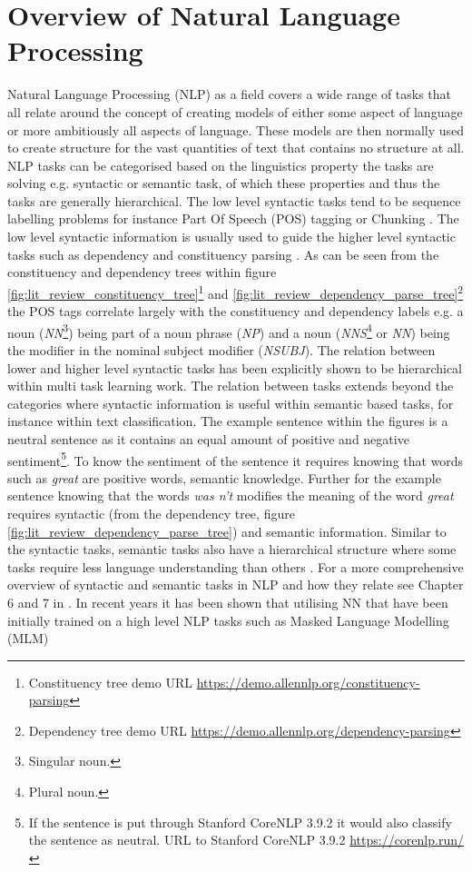 \section{Overview of Natural Language Processing}
Natural Language Processing (NLP) as a field covers a wide range of tasks that all relate around the concept of creating models of either some aspect of language or more ambitiously all aspects of language. These models are then normally used to create structure for the vast quantities of text that contains no structure at all. NLP tasks can be categorised based on the linguistics property the tasks are solving e.g. syntactic or semantic task, of which these properties and thus the tasks are generally hierarchical. The low level syntactic tasks tend to be sequence labelling problems for instance Part Of Speech (POS) tagging \citep{church-1988-stochastic, ling-etal-2015-finding} or Chunking \citep{tjong-kim-sang-buchholz-2000-introduction}. The low level syntactic information is usually used to guide the higher level syntactic tasks such as dependency \citep{nivre-etal-2007-conll} and constituency parsing \citep{collins-2003-head}. As can be seen from the constituency and dependency trees within figure \ref{fig:lit_review_constituency_tree}\footnote{Constituency tree demo URL \url{https://demo.allennlp.org/constituency-parsing}} and \ref{fig:lit_review_dependency_parse_tree}\footnote{Dependency tree demo URL \url{https://demo.allennlp.org/dependency-parsing}} the POS tags correlate largely with the constituency and dependency labels e.g. a noun (\textit{NN}\footnote{Singular noun.}) being part of a noun phrase (\textit{NP}) and a noun (\textit{NNS}\footnote{Plural noun.} or \textit{NN}) being the modifier in the nominal subject modifier (\textit{NSUBJ}). The relation between lower and higher level syntactic tasks has been explicitly shown to be hierarchical within \citet{sogaard-goldberg-2016-deep} multi task learning work. The relation between tasks extends beyond the categories where syntactic information is useful within semantic based tasks, for instance within text classification. The example sentence within the figures is a neutral sentence as it contains an equal amount of positive and negative sentiment\footnote{If the sentence is put through Stanford CoreNLP 3.9.2 it would also classify the sentence as neutral. URL to Stanford CoreNLP 3.9.2 \url{https://corenlp.run/}}. To know the sentiment of the sentence it requires knowing that words such as \textit{great} are positive words, semantic knowledge. Further for the example sentence knowing that the words \textit{was n't} modifies the meaning of the word \textit{great} requires syntactic (from the dependency tree, figure \ref{fig:lit_review_dependency_parse_tree}) and semantic information. Similar to the syntactic tasks, semantic tasks also have a hierarchical structure where some tasks require less language understanding than others \citet{sanh2019hierarchical}. For a more comprehensive overview of syntactic and semantic tasks in NLP and how they relate see Chapter 6 and 7 in \citet{goldberg2017neural}. In recent years it has been shown that utilising NN that have been initially trained on a high level NLP tasks such as Masked Language Modelling (MLM) 